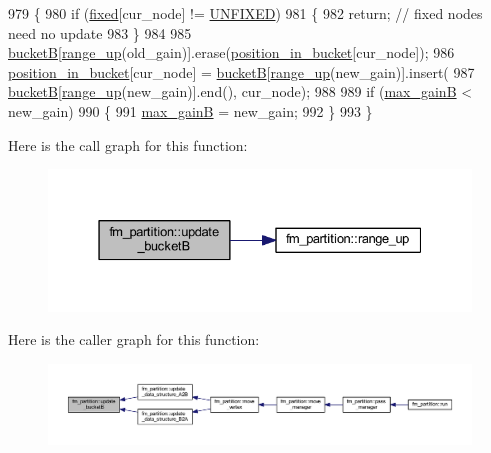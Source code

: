 \begin{DoxyCode}
979 \{
980     \textcolor{keywordflow}{if} (\mbox{\hyperlink{classfm__partition_a3b04658dbb5b27ddd20194ff74a71082}{fixed}}[cur\_node] != \mbox{\hyperlink{classfm__partition_a24447561db0ea633212c597c5e1fca56}{UNFIXED}})
981     \{
982     \textcolor{keywordflow}{return}; \textcolor{comment}{// fixed nodes need no update}
983     \}
984 
985     \mbox{\hyperlink{classfm__partition_ae6a5b5f3f2d95ea229882e861ccfc9e4}{bucketB}}[\mbox{\hyperlink{classfm__partition_ac49d477ecbf512fa375b76a472ec54f8}{range\_up}}(old\_gain)].erase(\mbox{\hyperlink{classfm__partition_ad17406d94b53c327e31b28e462de010f}{position\_in\_bucket}}[cur\_node]);
986     \mbox{\hyperlink{classfm__partition_ad17406d94b53c327e31b28e462de010f}{position\_in\_bucket}}[cur\_node] = \mbox{\hyperlink{classfm__partition_ae6a5b5f3f2d95ea229882e861ccfc9e4}{bucketB}}[\mbox{\hyperlink{classfm__partition_ac49d477ecbf512fa375b76a472ec54f8}{range\_up}}(new\_gain)].insert(
987     \mbox{\hyperlink{classfm__partition_ae6a5b5f3f2d95ea229882e861ccfc9e4}{bucketB}}[\mbox{\hyperlink{classfm__partition_ac49d477ecbf512fa375b76a472ec54f8}{range\_up}}(new\_gain)].end(), cur\_node);
988 
989     \textcolor{keywordflow}{if} (\mbox{\hyperlink{classfm__partition_ac230f89828768eaf51374c0bc3b37558}{max\_gainB}} < new\_gain)
990     \{
991     \mbox{\hyperlink{classfm__partition_ac230f89828768eaf51374c0bc3b37558}{max\_gainB}} = new\_gain;
992     \}
993 \}
\end{DoxyCode}
Here is the call graph for this function\+:\nopagebreak
\begin{figure}[H]
\begin{center}
\leavevmode
\includegraphics[width=331pt]{classfm__partition_a270d469ca584ed9adff9fced67743679_cgraph}
\end{center}
\end{figure}
Here is the caller graph for this function\+:\nopagebreak
\begin{figure}[H]
\begin{center}
\leavevmode
\includegraphics[width=350pt]{classfm__partition_a270d469ca584ed9adff9fced67743679_icgraph}
\end{center}
\end{figure}
\mbox{\label{classfm__partition_a8bd7f2715334e9ec95da8001117fdde5}} 
